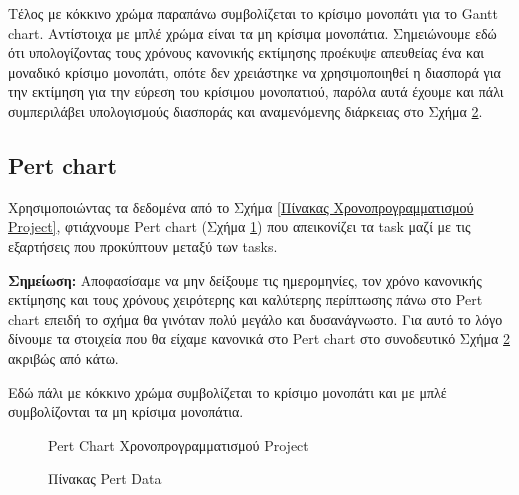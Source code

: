 \documentclass[12pt,a4paper]{article}
\begin{document}
Τέλος με κόκκινο χρώμα παραπάνω συμβολίζεται το κρίσιμο μονοπάτι για το Gantt chart. Αντίστοιχα με μπλέ χρώμα είναι τα μη κρίσιμα μονοπάτια. Σημειώνουμε εδώ ότι υπολογίζοντας τους χρόνους κανονικής εκτίμησης προέκυψε απευθείας ένα και μοναδικό κρίσιμο μονοπάτι, οπότε δεν χρειάστηκε να χρησιμοποιηθεί η διασπορά για την εκτίμηση για την εύρεση του κρίσιμου μονοπατιού, παρόλα αυτά έχουμε και πάλι συμπεριλάβει υπολογισμούς διασποράς και αναμενόμενης διάρκειας στο Σχήμα \ref{Πίνακας Pert Data}.


\subsection{Pert chart}
\label{Ενότητα Pert Chart}
Χρησιμοποιώντας τα δεδομένα από το Σχήμα \ref{Πίνακας Χρονοπρογραμματισμού Project}, φτιάχνουμε Pert chart (Σχήμα \ref{Pert Chart Χρονοπρογραμματισμού Project}) που απεικονίζει τα task μαζί με τις εξαρτήσεις που προκύπτουν μεταξύ των tasks.

\textbf{Σημείωση:} Αποφασίσαμε να μην δείξουμε τις ημερομηνίες, τον χρόνο κανονικής εκτίμησης και τους χρόνους χειρότερης και καλύτερης περίπτωσης πάνω στο Pert chart επειδή το σχήμα θα γινόταν πολύ μεγάλο και δυσανάγνωστο. Για αυτό το λόγο δίνουμε τα στοιχεία που θα είχαμε κανονικά στο Pert chart στο συνοδευτικό Σχήμα \ref{Πίνακας Pert Data} ακριβώς από κάτω.

Εδώ πάλι με κόκκινο χρώμα συμβολίζεται το κρίσιμο μονοπάτι και με μπλέ συμβολίζονται τα μη κρίσιμα μονοπάτια.

\begin{figure}[H]
	\caption{Pert Chart Χρονοπρογραμματισμού Project}
	\label{Pert Chart Χρονοπρογραμματισμού Project}
\end{figure}

\begin{figure}[H]
	\caption{Πίνακας Pert Data}
	\label{Πίνακας Pert Data}
\end{figure}
\end{document}
